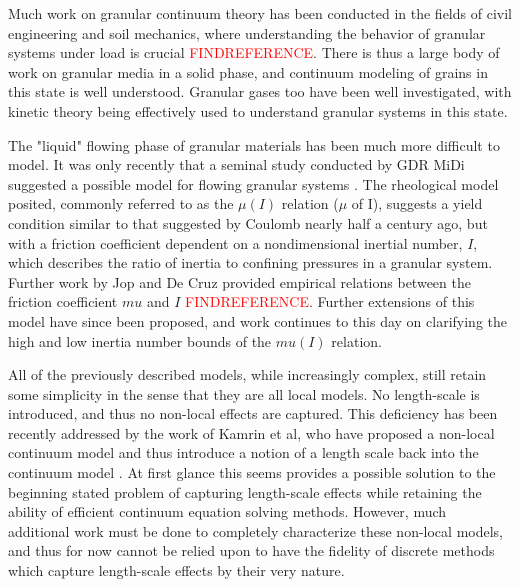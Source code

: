 Much work on granular continuum theory has been conducted in the fields of civil engineering and soil mechanics, where understanding the behavior of granular systems under load is crucial \textcolor{red}{FINDREFERENCE}. There is thus a large body of work on granular media in a solid phase, and continuum modeling of grains in this state is well understood. Granular gases too have been well investigated, with kinetic theory being effectively used to understand granular systems in this state.

The "liquid" flowing phase of granular materials has been much more difficult to model. It was only recently that a seminal study conducted by GDR MiDi suggested a possible model for flowing granular systems \cite{Midi:2004:Dense}. The rheological model posited, commonly referred to as the $\mu(I)$ relation ($\mu$ of I), suggests a yield condition similar to that suggested by Coulomb nearly half a century ago, but with a friction coefficient dependent on a nondimensional inertial number, $I$, which describes the ratio of inertia to confining pressures in a granular system. Further work by Jop and De Cruz provided empirical relations between the friction coefficient $mu$ and $I$ \cite{Jop:2006:Constitutive}\textcolor{red}{FINDREFERENCE}. Further extensions of this model have since been proposed, and work continues to this day on clarifying the high and low inertia number bounds of the $mu(I)$ relation. 

All of the previously described models, while increasingly complex, still retain some simplicity in the sense that they are all local models. No length-scale is introduced, and thus no non-local effects are captured. This deficiency has been recently addressed by the work of Kamrin et al, who have proposed a non-local continuum model and thus introduce a notion of a length scale back into the continuum model \cite{Kamrin:2012:Nonlocal}. At first glance this seems provides a possible solution to the beginning stated problem of capturing length-scale effects while retaining the ability of efficient continuum equation solving methods. However, much additional work must be done to completely characterize these non-local models, and thus for now cannot be relied upon to have the fidelity of discrete methods which capture length-scale effects by their very nature.

